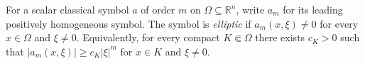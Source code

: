 
For a scalar classical symbol $a$ of order $m$ on $\Omega\subseteq\mathbb R^n$, write $a_m$ for its leading positively homogeneous symbol. The symbol is \emph{elliptic} if $a_m(x,\xi)\ne0$ for every $x\in\Omega$ and $\xi\ne0$. Equivalently, for every compact $K\Subset\Omega$ there exists $c_K>0$ such that $|a_m(x,\xi)|\ge c_K|\xi|^m$ for $x\in K$ and $\xi\ne0$.
